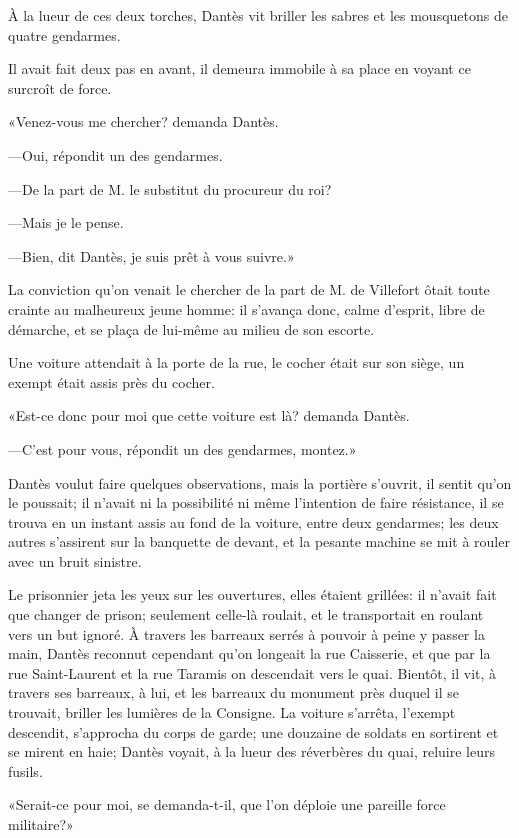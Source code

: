 À la lueur de ces deux torches, Dantès vit briller les sabres et les mousquetons de quatre gendarmes.

Il avait fait deux pas en avant, il demeura immobile à sa place en voyant ce surcroît de force.

«Venez-vous me chercher? demanda Dantès.

—Oui, répondit un des gendarmes.

—De la part de M. le substitut du procureur du roi?

—Mais je le pense.

—Bien, dit Dantès, je suis prêt à vous suivre.»

La conviction qu'on venait le chercher de la part de M. de Villefort ôtait toute crainte au malheureux jeune homme: il s'avança donc, calme d'esprit, libre de démarche, et se plaça de lui-même au milieu de son escorte.

Une voiture attendait à la porte de la rue, le cocher était sur son siège, un exempt était assis près du cocher.

«Est-ce donc pour moi que cette voiture est là? demanda Dantès.

—C'est pour vous, répondit un des gendarmes, montez.»

Dantès voulut faire quelques observations, mais la portière s'ouvrit, il sentit qu'on le poussait; il n'avait ni la possibilité ni même l'intention de faire résistance, il se trouva en un instant assis au fond de la voiture, entre deux gendarmes; les deux autres s'assirent sur la banquette de devant, et la pesante machine se mit à rouler avec un bruit sinistre.

Le prisonnier jeta les yeux sur les ouvertures, elles étaient grillées: il n'avait fait que changer de prison; seulement celle-là roulait, et le transportait en roulant vers un but ignoré. À travers les barreaux serrés à pouvoir à peine y passer la main, Dantès reconnut cependant qu'on longeait la rue Caisserie, et que par la rue Saint-Laurent et la rue Taramis on descendait vers le quai. Bientôt, il vit, à travers ses barreaux, à lui, et les barreaux du monument près duquel il se trouvait, briller les lumières de la Consigne. La voiture s'arrêta, l'exempt descendit, s'approcha du corps de garde; une douzaine de soldats en sortirent et se mirent en haie; Dantès voyait, à la lueur des réverbères du quai, reluire leurs fusils.

«Serait-ce pour moi, se demanda-t-il, que l'on déploie une pareille force militaire?»

